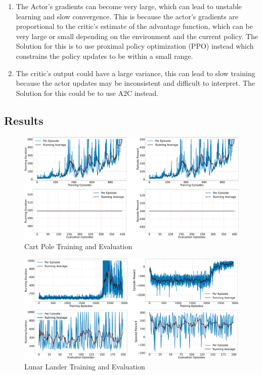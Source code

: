 \documentclass{article} %
\begin{document}
\begin{enumerate}
\item The Actor's gradients can become very large, which can lead to unstable learning and slow convergence. This is because the actor's gradients are proportional to the critic's estimate of the advantage function, which can be very large or small depending on the environment and the current policy. The Solution for this is to use proximal policy optimization (PPO) instead which constrains the policy updates to be within a small range.
\item The critic's output could have a large variance, this can lead to slow training because the actor updates may be inconsistent and difficult to interpret. The Solution for this could be to use A2C instead.
\end{enumerate}

\subsection{Results}
\begin{figure}[H]
    \begin{center}
        \includegraphics[width=\textwidth]{qac_cartpole.png}
    \end{center}
    \caption{Cart Pole Training and Evaluation}
\end{figure}

\begin{figure}[H]
    \begin{center}
        \includegraphics[width=\textwidth]{qac_lunar.png}
    \end{center}
    \caption{Lunar Lander Training and Evaluation}
\end{figure}
\end{document}
